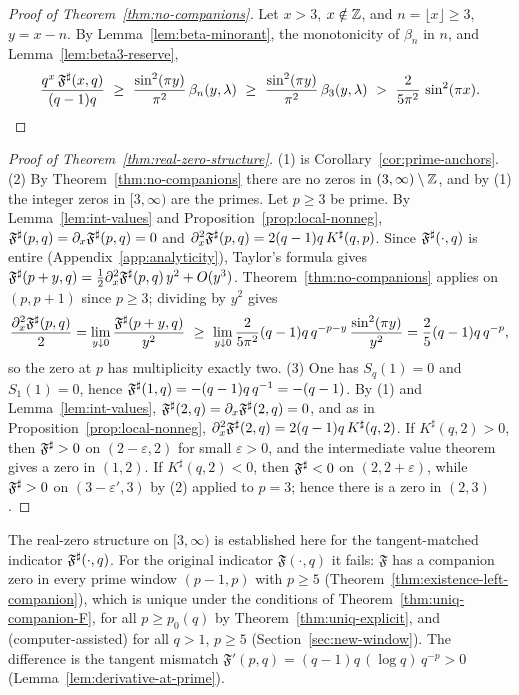 \begin{proof}[Proof of Theorem~\ref{thm:no-companions}]
Let $x>3$, $x\notin\mathbb{Z}$, and $n=\lfloor x\rfloor\ge3$, $y=x-n$. By Lemma~\ref{lem:beta-minorant}, the monotonicity of $\beta_n$ in $n$, and Lemma~\ref{lem:beta3-reserve},
\[
\frac{q^{x}\,\Fsharp(x,q)}{(q-1)q}\ \ge\ \frac{\sin^2(\pi y)}{\pi^2}\,\beta_n(y,\lambda)\ \ge\ \frac{\sin^2(\pi y)}{\pi^2}\,\beta_3(y,\lambda)\ >\ \frac{2}{5\pi^2}\,\sin^2(\pi x).
\qedhere
\]
\end{proof}

\begin{proof}[Proof of Theorem~\ref{thm:real-zero-structure}]
(1) is Corollary~\ref{cor:prime-anchors}. (2) By Theorem~\ref{thm:no-companions} there are no zeros in $(3,\infty)\setminus\mathbb{Z}$, and by (1) the integer zeros in $[3,\infty)$ are the primes. Let $p\ge3$ be prime. By Lemma~\ref{lem:int-values} and Proposition~\ref{prop:local-nonneg}, $\mathfrak F^{\sharp}(p,q)=\partial_x\mathfrak F^{\sharp}(p,q)=0$ and $\partial_x^2\mathfrak F^{\sharp}(p,q)=2(q-1)q\,K^\sharp(q,p)$. Since $\mathfrak F^{\sharp}(\cdot,q)$ is entire (Appendix~\ref{app:analyticity}), Taylor's formula gives $\mathfrak F^{\sharp}(p+y,q)=\tfrac12\partial_x^2\mathfrak F^{\sharp}(p,q)\,y^2+O(y^3)$. Theorem~\ref{thm:no-companions} applies on $(p,p+1)$ since $p\ge3$; dividing by $y^2$ gives
\[
\frac{\partial_x^2\Fsharp(p,q)}{2}=\lim_{y\downarrow0}\frac{\Fsharp(p+y,q)}{y^2}\ \ge\ \lim_{y\downarrow0}\frac{2}{5\pi^2}(q-1)q\,q^{-p-y}\,\frac{\sin^2(\pi y)}{y^2}=\frac25(q-1)q\,q^{-p},
\]
so the zero at $p$ has multiplicity exactly two. (3) One has $S_q(1)=0$ and $S_1(1)=0$, hence $\mathfrak F^{\sharp}(1,q)=-(q-1)q\,q^{-1}=-(q-1)$. By (1) and Lemma~\ref{lem:int-values}, $\mathfrak F^{\sharp}(2,q)=\partial_x\mathfrak F^{\sharp}(2,q)=0$, and as in Proposition~\ref{prop:local-nonneg}, $\partial_x^2\mathfrak F^{\sharp}(2,q)=2(q-1)q\,K^\sharp(q,2)$. If $K^\sharp(q,2)>0$, then $\mathfrak F^{\sharp}>0$ on $(2-\varepsilon,2)$ for small $\varepsilon>0$, and the intermediate value theorem gives a zero in $(1,2)$. If $K^\sharp(q,2)<0$, then $\mathfrak F^{\sharp}<0$ on $(2,2+\varepsilon)$, while $\mathfrak F^{\sharp}>0$ on $(3-\varepsilon',3)$ by (2) applied to $p=3$; hence there is a zero in $(2,3)$.
\end{proof}

\begin{remark}\label{rem:scope-f-vs-fsharp}
The real-zero structure on $[3,\infty)$ is established here for the tangent-matched indicator $\mathfrak F^{\sharp}(\cdot,q)$. For the original indicator $\mathfrak F(\cdot,q)$ it fails: $\mathfrak F$ has a companion zero in every prime window $(p-1,p)$ with $p\ge5$ (Theorem~\ref{thm:existence-left-companion}), which is unique under the conditions of Theorem~\ref{thm:uniq-companion-F}, for all $p\ge p_0(q)$ by Theorem~\ref{thm:uniq-explicit}, and (computer-assisted) for all $q>1$, $p\ge5$ (Section~\ref{sec:new-window}). The difference is the tangent mismatch $\mathfrak F'(p,q)=(q-1)q\,(\log q)\,q^{-p}>0$ (Lemma~\ref{lem:derivative-at-prime}).
\end{remark}

